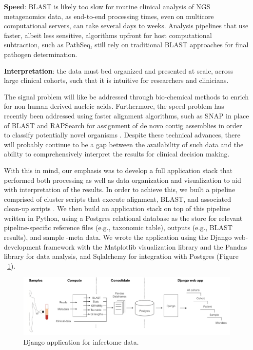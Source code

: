 \textbf{Speed}: BLAST is likely too slow for routine clinical analysis of NGS metagenomics data, as end-to-end processing times, even on multicore computational servers, can take several days to weeks.  Analysis pipelines that use faster, albeit less sensitive, algorithms upfront for host computational subtraction, such as PathSeq, still rely on traditional BLAST approaches for final pathogen determination.  

\textbf{Interpretation}: the data must bed organized and presented at scale, across large clinical cohorts, such that it is intuitive for researchers and clinicians.

The signal problem will like be addressed through bio-chemical methods to enrich for non-human derived nucleic acids. Furthermore, the speed problem has recently been addressed using faster alignment algorithms, such as SNAP in place of BLAST and RAPSearch for assignment of de novo contig assemblies in order to classify potentially novel organisms \cite{Naccache:2014gk}. Despite these technical advances, there will probably continue to be a gap between the availability of such data and the ability to comprehensively interpret the results for clinical decision making. 

With this in mind, our emphasis was to develop a full application stack that performed both processing as well as data organization and visualization to aid with interpretation of the results. In order to achieve this, we built a pipeline comprised of cluster scripts that execute alignment, BLAST, and associated clean-up scripts \cite{Xia:2011it}. We then build an application stack on top of this pipeline written in Python, using a Postgres relational database as the store for relevant pipeline-specific reference files (e.g., taxonomic table), outputs (e.g., BLAST results), and sample -meta data. We wrote the application using the Django web-development framework with the Matplotlib visualization library \cite{Hunter:2007ux} and the Pandas library for data analysis, and Sqlalchemy for integration with Postgres (Figure ~\ref{fig:Fig4}).

\begin{figure}
\center\includegraphics[width=150mm,scale=0.5]{Figures/Fig4}
\caption{Django application for infectome data.}
\label{fig:Fig4}
\end{figure}


